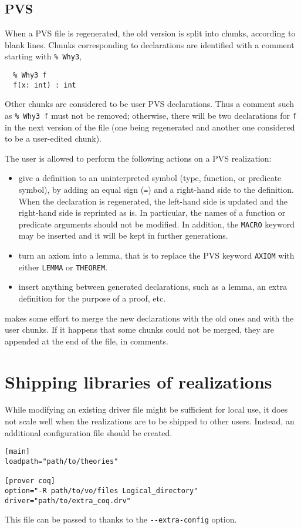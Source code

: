 \subsection{PVS}

When a PVS file is regenerated, the old version is split into chunks,
according to blank lines. Chunks corresponding to \why declarations
are identified with a comment starting with \verb+% Why3+, \eg
\begin{verbatim}
  % Why3 f
  f(x: int) : int
\end{verbatim}
Other chunks are considered to be user PVS declarations.
Thus a comment such as \verb+% Why3 f+ must not be removed;
otherwise, there will be two
declarations for \texttt{f} in the next version of the file (one being
regenerated and another one considered to be a user-edited chunk).

The user is allowed to perform the following actions on a PVS
realization:
\begin{itemize}
\item give a definition to an uninterpreted symbol (type, function, or
  predicate symbol), by adding an equal sign (\texttt{=}) and a
  right-hand side to the definition. When the declaration is
  regenerated, the left-hand side is updated and the right-hand side
  is reprinted as is. In particular, the names of a function or
  predicate arguments should not be modified. In addition, the
  \texttt{MACRO} keyword may be inserted and it will be kept in
  further generations.

\item turn an axiom into a lemma, that is to replace the PVS keyword
  \texttt{AXIOM} with either \texttt{LEMMA} or \texttt{THEOREM}.

\item insert anything between generated declarations, such as a lemma,
  an extra definition for the purpose of a proof, etc.
\end{itemize}
\why makes some effort to merge the new declarations with the old ones
and with the user chunks. If it happens that some chunks could not be
merged, they are appended at the end of the file, in comments.

\section{Shipping libraries of realizations}

While modifying an existing driver file might be sufficient for local
use, it does not scale well when the realizations are to be shipped to
other users. Instead, an additional configuration file should be created.

\begin{verbatim}
[main]
loadpath="path/to/theories"

[prover coq]
option="-R path/to/vo/files Logical_directory"
driver="path/to/extra_coq.drv"
\end{verbatim}

This file can be passed to \why thanks to the \verb+--extra-config+
option.

